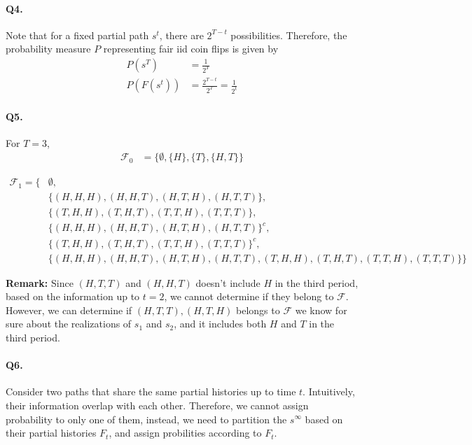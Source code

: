 \documentclass[11pt]{article}
\theoremstyle{definition}
\theoremstyle{boldtitle} %
\numberwithin{equation}{section}
\numberwithin{figure}{section}
\numberwithin{table}{section}
\begin{document}
\paragraph{Q4.}
Note that for a fixed partial path $s^t$, there are $2^{T-t}$ possibilities.
Therefore,
the probability measure $P$ representing fair iid coin flips is given by
\begin{align*}
    P(s^T) & = \frac{1}{2^T} \\ 
    P(F(s^t)) & = \frac{2^{T-t}}{2^T} = \frac{1}{2^{t}}
\end{align*}

\paragraph{Q5.} For $T=3$, 
\begin{align*}
    \mathcal{F}_0 & = \{\emptyset, \{H\}, \{T\}, \{H, T \} \} 
\end{align*}

\begin{align*}
    \mathcal{F}_1 = \{ & \emptyset, \\
        & \{(H, H, H), (H, H, T), (H, T, H), (H, T, T)\}, \\ 
        & \{(T, H, H), (T, H, T), (T, T, H), (T, T, T)\}, \\ 
        & \{(H, H, H), (H, H, T), (H, T, H), (H, T, T)\}^c, \\ 
        & \{(T, H, H), (T, H, T), (T, T, H), (T, T, T)\}^c, \\ 
        & \{(H, H, H), (H, H, T), (H, T, H), (H, T, T), (T, H, H), (T, H, T), (T, T, H), (T, T, T)\} \}
\end{align*}

\noindent \textbf{Remark:}
Since $(H, T, T)$ and $(H, H, T)$ doesn't include $H$ in the third period, 
based on the information up to $t=2$, we cannot determine if they belong to $\mathcal{F}$.
However, we can determine if ${(H, T, T), (H, T, H)}$ belongs to $\mathcal{F}$ 
we know for sure about the realizations of $s_1$ and $s_2$, and it includes both $H$ and $T$ in the third period.

\paragraph{Q6.}
Consider two paths that share the same partial histories up to time $t$.
Intuitively, their information overlap with each other. 
Therefore, we cannot assign probability to only one of them,
instead, we need to partition the $s^\infty$ based on their partial histories $F_t$, and assign probilities according to $F_t$.
\end{document}
